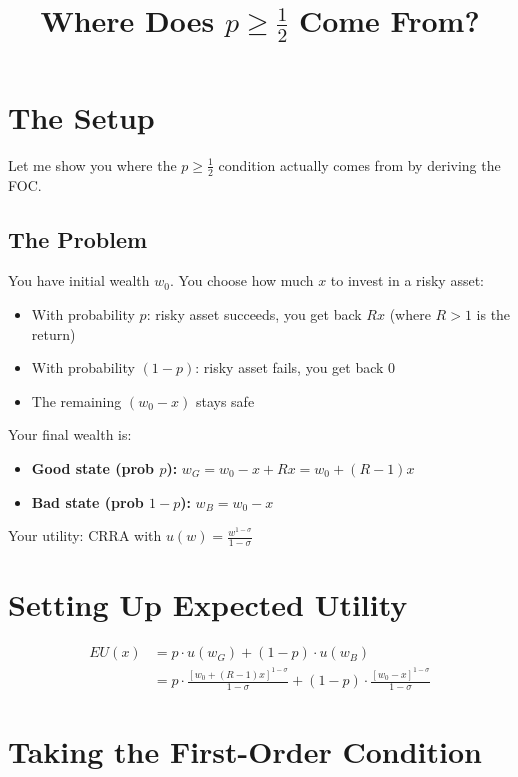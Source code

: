 \documentclass[12pt]{article}
\title{\textbf{Where Does $p \geq \frac{1}{2}$ Come From?}}
\author{}
\date{}
\begin{document}
\maketitle

\section*{The Setup}

Let me show you where the $p \geq \frac{1}{2}$ condition actually comes from by deriving the FOC.

\subsection*{The Problem}

You have initial wealth $w_0$. You choose how much $x$ to invest in a risky asset:

\begin{itemize}
\item With probability $p$: risky asset succeeds, you get back $Rx$ (where $R > 1$ is the return)
\item With probability $(1-p)$: risky asset fails, you get back $0$
\item The remaining $(w_0 - x)$ stays safe
\end{itemize}

Your final wealth is:
\begin{itemize}
\item \textbf{Good state (prob $p$):} $w_G = w_0 - x + Rx = w_0 + (R-1)x$
\item \textbf{Bad state (prob $1-p$):} $w_B = w_0 - x$
\end{itemize}

Your utility: CRRA with $u(w) = \frac{w^{1-\sigma}}{1-\sigma}$

\section*{Setting Up Expected Utility}

\begin{align*}
EU(x) &= p \cdot u(w_G) + (1-p) \cdot u(w_B) \\
&= p \cdot \frac{[w_0 + (R-1)x]^{1-\sigma}}{1-\sigma} + (1-p) \cdot \frac{[w_0 - x]^{1-\sigma}}{1-\sigma}
\end{align*}

\section*{Taking the First-Order Condition}
\end{document}
